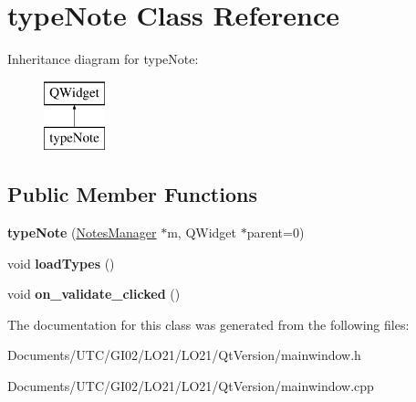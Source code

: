 \hypertarget{classtype_note}{}\section{type\+Note Class Reference}
\label{classtype_note}
Inheritance diagram for type\+Note\+:\begin{figure}[H]
\begin{center}
\leavevmode
\includegraphics[height=2.000000cm]{classtype_note}
\end{center}
\end{figure}
\subsection*{Public Member Functions}
\begin{DoxyCompactItemize}
\item 
\mbox{\label{classtype_note_a9e9ce5085521858a5b36d76d66618c2b}} 
{\bfseries type\+Note} (\hyperlink{class_notes_manager}{Notes\+Manager} $\ast$m, Q\+Widget $\ast$parent=0)
\item 
\mbox{\label{classtype_note_a367f23d98b0f1d749a6f4ee18998bf38}} 
void {\bfseries load\+Types} ()
\item 
\mbox{\label{classtype_note_a1ab64b02b765f812ab4ab8a9e527865e}} 
void {\bfseries on\+\_\+validate\+\_\+clicked} ()
\end{DoxyCompactItemize}


The documentation for this class was generated from the following files\+:\begin{DoxyCompactItemize}
\item 
Documents/\+U\+T\+C/\+G\+I02/\+L\+O21/\+L\+O21/\+Qt\+Version/mainwindow.\+h\item 
Documents/\+U\+T\+C/\+G\+I02/\+L\+O21/\+L\+O21/\+Qt\+Version/mainwindow.\+cpp\end{DoxyCompactItemize}
